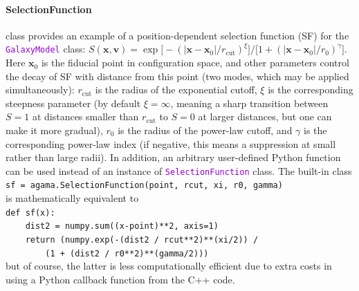 \documentclass[12pt]{article}
\newcommand{\ttt}[1]{\textcolor{darkviolet}{\texttt{#1}}}
\newcommand{\bv}{\boldsymbol{v}}
\newcommand{\bx}{\boldsymbol{x}}
\let\oldparagraph\paragraph
\renewcommand{\paragraph}[1]{\vspace{-2mm}\oldparagraph{#1}}
\begin{document}
\paragraph{SelectionFunction} class provides an example of a position-dependent selection function (SF) for the \ttt{GalaxyModel} class: $S(\bx, \bv) = \exp\big[-(|\bx-\bx_0|/r_\text{cut})^\xi\big] \big/ \big[1 + (|\bx-\bx_0|/r_0)^\gamma\big]$. Here $\bx_0$ is the fiducial point in configuration space, and other parameters control the decay of SF with distance from this point (two modes, which may be applied simultaneously): $r_\text{cut}$ is the radius of the exponential cutoff, $\xi$ is the corresponding steepness parameter (by default $\xi=\infty$, meaning a sharp transition between $S=1$ at distances smaller than $r_\text{cut}$ to $S=0$ at larger distances, but one can make it more gradual), $r_0$ is the radius of the power-law cutoff, and $\gamma$ is the corresponding power-law index (if negative, this means a suppression at small rather than large radii). In addition, an arbitrary user-defined Python function can be used instead of an instance of \ttt{SelectionFunction} class. The built-in class\\
\texttt{sf = agama.SelectionFunction(point, rcut, xi, r0, gamma)}\\
is mathematically equivalent to\\
\texttt{def sf(x):\\
\mbox{}~~~~dist2 = numpy.sum((x-point)**2, axis=1)\\
\mbox{}~~~~return (numpy.exp(-(dist2 / rcut**2)**(xi/2)) /\\
\mbox{}~~~~~~~~(1 + (dist2 / r0**2)**(gamma/2)))}\\
but of course, the latter is less computationally efficient due to extra costs in using a Python callback function from the C++ code.
\end{document}
